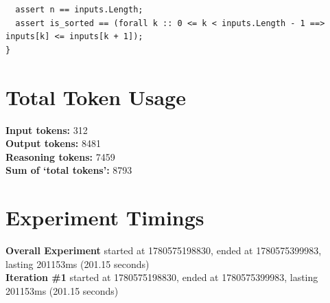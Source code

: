 \documentclass{article}
\begin{document}
\begin{lstlisting}
  assert n == inputs.Length;
  assert is_sorted == (forall k :: 0 <= k < inputs.Length - 1 ==> inputs[k] <= inputs[k + 1]);
}
\end{lstlisting}
\section*{Total Token Usage}
\textbf{Input tokens: }312
\\\textbf{Output tokens: }8481
\\\textbf{Reasoning tokens: }7459
\\\textbf{Sum of `total tokens': }8793
\section*{Experiment Timings}
\textbf{Overall Experiment} started at 1780575198830, ended at 1780575399983, lasting 201153ms (201.15 seconds)
\\\textbf{Iteration \#1} started at 1780575198830, ended at 1780575399983, lasting 201153ms (201.15 seconds)
\end{document}
